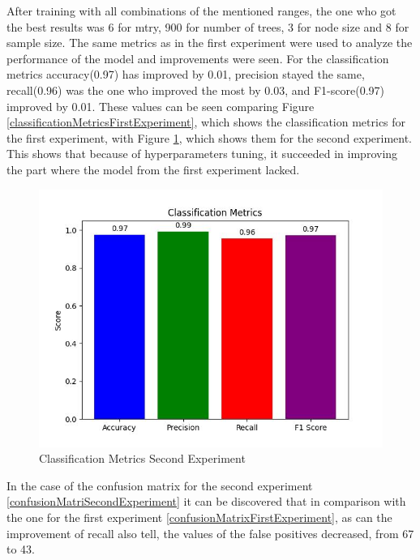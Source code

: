 After training with all combinations of the mentioned ranges, the one who got the best results was 6 for mtry, 900 for number of trees, 3 for node size and 8 for sample size. The same metrics as in the first experiment were used to analyze the performance of the model and improvements were seen. For the classification metrics accuracy(0.97) has improved by 0.01, precision stayed the same, recall(0.96) was the one who improved the most by 0.03, and F1-score(0.97) improved by 0.01. These values can be seen comparing Figure \ref{classificationMetricsFirstExperiment}, which shows the classification metrics for the first experiment, with Figure \ref{classificationMetricsSecondExperiment}, which shows them for the second experiment. This shows that because of hyperparameters tuning, it succeeded in improving the part where the model from the first experiment lacked.

\begin{figure}[htbp]
	\centering
		\includegraphics[scale=0.8]{LaTeX Bachelor Thesis Depression Signs Detection/figures/metrics/experiment2English/classificationMetrics.jpg}
	\caption{Classification Metrics Second Experiment}
	\label{classificationMetricsSecondExperiment}
\end{figure}

In the case of the confusion matrix for the second experiment \ref{confusionMatriSecondExperiment} it can be discovered that in comparison with the one for the first experiment \ref{confusionMatrixFirstExperiment}, as can the improvement of recall also tell, the values of the false positives decreased, from 67 to 43.

